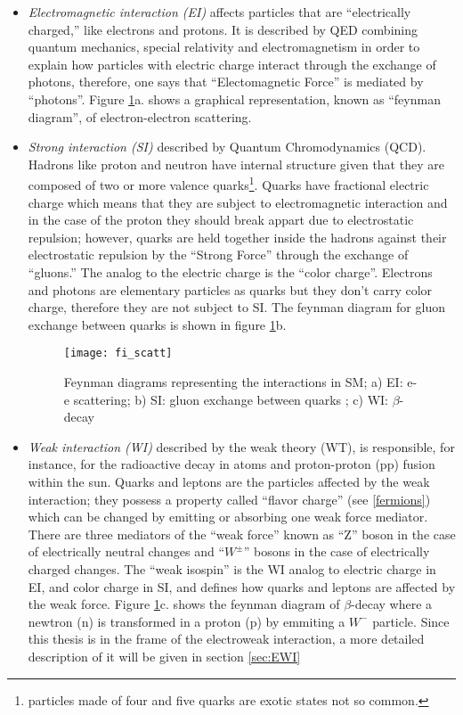 \begin{itemize}

\item \textit{Electromagnetic interaction (EI)} affects particles that are ``electrically charged,'' like electrons and protons. It is described by QED combining quantum mechanics, special relativity and electromagnetism in order to explain how particles with electric charge interact through the exchange of photons, therefore, one says that ``Electomagnetic Force'' is mediated by ``photons''. Figure \ref{fi_scatt}a. shows a graphical representation, known as ``feynman diagram'', of electron-electron scattering.    

\item \textit{Strong interaction (SI)} described by Quantum Chromodynamics (QCD). Hadrons like proton and neutron have internal structure given that they are composed of two or more valence quarks\footnote{particles made of four and five quarks are exotic states not so common.}. Quarks have fractional electric charge which means that they are subject to electromagnetic interaction and in the case of the proton they should break appart due to electrostatic repulsion; however, quarks are held together inside the hadrons against their electrostatic repulsion by the ``Strong Force'' through the exchange of ``gluons.'' The analog to the electric charge is the ``color charge''. Electrons and photons are elementary particles as quarks but they don't carry color charge, therefore they are not subject to SI. The feynman diagram for gluon exchange between quarks is shown in figure \ref{fi_scatt}b.  

\begin{figure}[h!]
\centering
    \texttt{[image: fi\_scatt]}
\caption[SM interactions diagrams]{Feynman diagrams representing the interactions in SM; a) EI: e-e scattering; b) SI: gluon exchange between quarks ; c) WI: $\beta$-decay }
\label{fi_scatt}
\end{figure}

\item \textit{Weak interaction (WI)} described by the weak theory (WT), is responsible, for instance, for the radioactive decay in atoms and proton-proton (pp) fusion within the sun. Quarks and leptons are the particles affected by the weak interaction; they possess a property called ``flavor charge'' (see \ref{fermions}) which can be changed by emitting or absorbing one weak force mediator. There are three mediators of the ``weak force'' known as ``Z'' boson in the case of electrically neutral changes and ``$W^\pm$'' bosons in the case of electrically charged changes. The ``weak isospin'' is the WI analog to electric charge in EI, and color charge in SI, and defines how quarks and leptons are affected by the weak force. Figure \ref{fi_scatt}c. shows the feynman diagram of $\beta$-decay where a newtron (n) is transformed in a proton (p) by emmiting a $W^-$ particle. Since this thesis is in the frame of the electroweak interaction, a more detailed description of it will be given in section \ref{sec:EWI}


\end{itemize}
